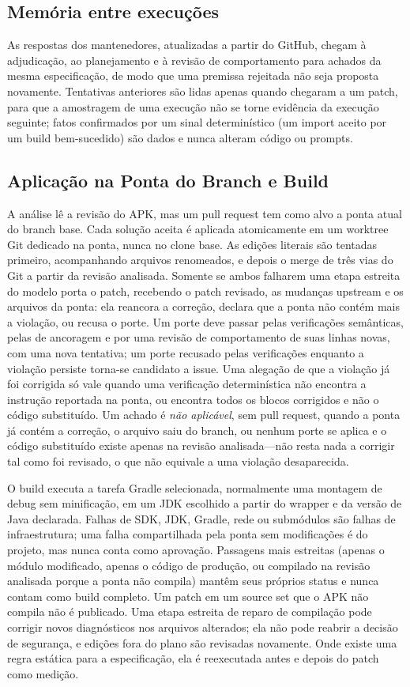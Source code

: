 \documentclass[conference]{IEEEtran}
\begin{document}
\subsection{Memória entre execuções}

As respostas dos mantenedores, atualizadas a partir do GitHub, chegam à
adjudicação, ao planejamento e à revisão de comportamento para achados da mesma
especificação, de modo que uma premissa rejeitada não seja proposta novamente. Tentativas
anteriores são lidas apenas quando chegaram a um patch, para que a amostragem
de uma execução não se torne evidência da execução seguinte; fatos confirmados
por um sinal determinístico (um import aceito por um build bem-sucedido) são
dados e nunca alteram código ou prompts.

\subsection{Aplicação na Ponta do Branch e Build}

A análise lê a revisão do APK, mas um pull request tem como alvo a ponta atual
do branch base. Cada solução aceita é aplicada atomicamente em um worktree Git
dedicado na ponta, nunca no clone base. As edições literais são tentadas
primeiro, acompanhando arquivos renomeados, e depois o merge de três vias do Git
a partir da revisão analisada. Somente se ambos falharem uma etapa estreita do
modelo porta o patch, recebendo o patch revisado, as mudanças upstream e os
arquivos da ponta: ela reancora a correção, declara que a ponta não contém mais
a violação, ou recusa o porte. Um porte deve passar pelas
verificações semânticas, pelas de ancoragem e por uma revisão de comportamento
de suas linhas novas, com uma nova tentativa; um porte recusado pelas
verificações enquanto a violação persiste torna-se candidato a issue. Uma
alegação de que a violação já foi corrigida só vale quando uma verificação
determinística não encontra a instrução reportada na ponta, ou encontra todos
os blocos corrigidos e não o código substituído. Um achado é \emph{não
aplicável}, sem pull request, quando a ponta já contém a correção, o arquivo
saiu do branch, ou nenhum porte se aplica e o código substituído
existe apenas na revisão analisada---não resta nada a corrigir tal como foi
revisado, o que não equivale a uma violação desaparecida.

O build executa a tarefa Gradle selecionada, normalmente uma montagem de debug
sem minificação, em um JDK escolhido a partir do wrapper e da versão de Java
declarada.
Falhas de SDK, JDK, Gradle, rede ou submódulos são falhas de infraestrutura;
uma falha compartilhada pela ponta sem modificações é do projeto, mas nunca
conta como aprovação. Passagens mais estreitas (apenas o módulo modificado,
apenas o código de produção, ou compilado na revisão analisada porque a ponta
não compila) mantêm seus próprios status e nunca contam como build completo. Um
patch em um source set que o APK não compila não é publicado. Uma etapa
estreita de reparo de compilação pode corrigir novos diagnósticos nos arquivos
alterados; ela não pode reabrir a decisão de segurança, e edições fora do plano
são revisadas novamente. Onde existe uma regra estática para a especificação,
ela é reexecutada antes e depois do patch como medição.
\end{document}
